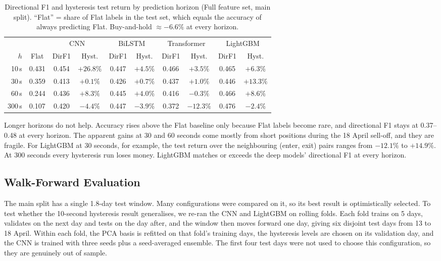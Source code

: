 \begin{table}[htbp]
\centering
\caption{Directional F1 and hysteresis test return by prediction horizon (Full feature
set, main split). ``Flat'' = share of Flat labels in the test set, which equals the
accuracy of always predicting Flat. Buy-and-hold $\approx -6.6\%$ at every horizon.}
\label{tab:horizon}
\begin{tabular}{rc cc cc cc cc}
\toprule
 & & \multicolumn{2}{c}{CNN} & \multicolumn{2}{c}{BiLSTM} & \multicolumn{2}{c}{Transformer} & \multicolumn{2}{c}{LightGBM} \\
\cmidrule(lr){3-4}\cmidrule(lr){5-6}\cmidrule(lr){7-8}\cmidrule(lr){9-10}
$h$ & Flat & DirF1 & Hyst. & DirF1 & Hyst. & DirF1 & Hyst. & DirF1 & Hyst. \\
\midrule
10\,s  & 0.431 & 0.454 & $+26.8\%$ & 0.447 & $+4.5\%$ & 0.466 & $+3.5\%$  & 0.465 & $+6.3\%$ \\
30\,s  & 0.359 & 0.413 & $+0.1\%$  & 0.426 & $+0.7\%$ & 0.437 & $+1.0\%$  & 0.446 & $+13.3\%$ \\
60\,s  & 0.244 & 0.436 & $+8.3\%$  & 0.445 & $+4.0\%$ & 0.416 & $-0.3\%$  & 0.466 & $+8.6\%$ \\
300\,s & 0.107 & 0.420 & $-4.4\%$  & 0.447 & $-3.9\%$ & 0.372 & $-12.3\%$ & 0.476 & $-2.4\%$ \\
\bottomrule
\end{tabular}
\end{table}

Longer horizons do not help. Accuracy rises above the Flat baseline only because Flat
labels become rare, and directional F1 stays at 0.37--0.48 at every horizon. The
apparent gains at 30 and 60 seconds come mostly from short positions during the 18 April
sell-off, and they are fragile. For LightGBM at 30 seconds, for example, the test return
over the neighbouring (enter, exit) pairs ranges from $-12.1\%$ to $+14.9\%$. At 300
seconds every hysteresis run loses money. LightGBM matches or exceeds the deep models'
directional F1 at every horizon.

\subsection{Walk-Forward Evaluation}
\label{sec:walkforward}

The main split has a single 1.8-day test window. Many configurations were compared on
it, so its best result is optimistically selected. To test whether the 10-second
hysteresis result generalises, we re-ran the CNN and LightGBM on rolling folds. Each fold
trains on 5 days, validates on the next day and tests on the day after, and the window
then moves forward one day, giving six disjoint test days from 13 to 18 April. Within
each fold, the PCA basis is refitted on that fold's training days, the hysteresis levels
are chosen on its validation day, and the CNN is trained with three seeds plus a
seed-averaged ensemble. The first four test days were not used to choose this
configuration, so they are genuinely out of sample.

